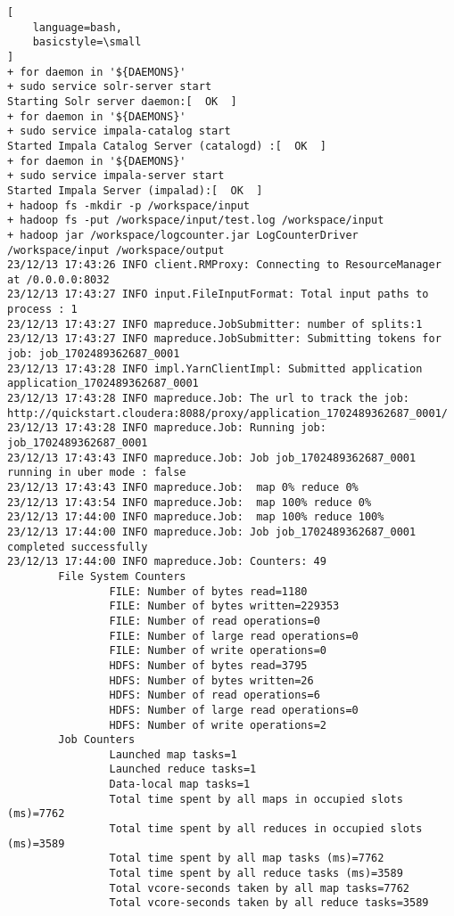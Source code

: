 \documentclass[a4paper]{article}
\begin{document}
\begin{lstlisting}[
    language=bash,
    basicstyle=\small
]
+ for daemon in '${DAEMONS}'
+ sudo service solr-server start
Starting Solr server daemon:[  OK  ]
+ for daemon in '${DAEMONS}'
+ sudo service impala-catalog start
Started Impala Catalog Server (catalogd) :[  OK  ]
+ for daemon in '${DAEMONS}'
+ sudo service impala-server start
Started Impala Server (impalad):[  OK  ]
+ hadoop fs -mkdir -p /workspace/input
+ hadoop fs -put /workspace/input/test.log /workspace/input
+ hadoop jar /workspace/logcounter.jar LogCounterDriver /workspace/input /workspace/output
23/12/13 17:43:26 INFO client.RMProxy: Connecting to ResourceManager at /0.0.0.0:8032
23/12/13 17:43:27 INFO input.FileInputFormat: Total input paths to process : 1
23/12/13 17:43:27 INFO mapreduce.JobSubmitter: number of splits:1
23/12/13 17:43:27 INFO mapreduce.JobSubmitter: Submitting tokens for job: job_1702489362687_0001
23/12/13 17:43:28 INFO impl.YarnClientImpl: Submitted application application_1702489362687_0001
23/12/13 17:43:28 INFO mapreduce.Job: The url to track the job: http://quickstart.cloudera:8088/proxy/application_1702489362687_0001/
23/12/13 17:43:28 INFO mapreduce.Job: Running job: job_1702489362687_0001
23/12/13 17:43:43 INFO mapreduce.Job: Job job_1702489362687_0001 running in uber mode : false
23/12/13 17:43:43 INFO mapreduce.Job:  map 0% reduce 0%
23/12/13 17:43:54 INFO mapreduce.Job:  map 100% reduce 0%
23/12/13 17:44:00 INFO mapreduce.Job:  map 100% reduce 100%
23/12/13 17:44:00 INFO mapreduce.Job: Job job_1702489362687_0001 completed successfully
23/12/13 17:44:00 INFO mapreduce.Job: Counters: 49
        File System Counters
                FILE: Number of bytes read=1180
                FILE: Number of bytes written=229353
                FILE: Number of read operations=0
                FILE: Number of large read operations=0
                FILE: Number of write operations=0
                HDFS: Number of bytes read=3795
                HDFS: Number of bytes written=26
                HDFS: Number of read operations=6
                HDFS: Number of large read operations=0
                HDFS: Number of write operations=2
        Job Counters
                Launched map tasks=1
                Launched reduce tasks=1
                Data-local map tasks=1
                Total time spent by all maps in occupied slots (ms)=7762
                Total time spent by all reduces in occupied slots (ms)=3589
                Total time spent by all map tasks (ms)=7762
                Total time spent by all reduce tasks (ms)=3589
                Total vcore-seconds taken by all map tasks=7762
                Total vcore-seconds taken by all reduce tasks=3589

\end{lstlisting}
\end{document}

